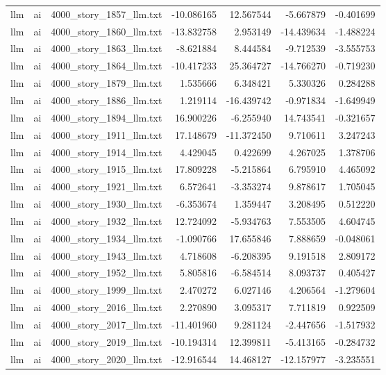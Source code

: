 \begin{longtable}{lllrrrr}
llm & ai & 4000\_story\_1857\_llm.txt & -10.086165 & 12.567544 & -5.667879 & -0.401699 \\
llm & ai & 4000\_story\_1860\_llm.txt & -13.832758 & 2.953149 & -14.439634 & -1.488224 \\
llm & ai & 4000\_story\_1863\_llm.txt & -8.621884 & 8.444584 & -9.712539 & -3.555753 \\
llm & ai & 4000\_story\_1864\_llm.txt & -10.417233 & 25.364727 & -14.766270 & -0.719230 \\
llm & ai & 4000\_story\_1879\_llm.txt & 1.535666 & 6.348421 & 5.330326 & 0.284288 \\
llm & ai & 4000\_story\_1886\_llm.txt & 1.219114 & -16.439742 & -0.971834 & -1.649949 \\
llm & ai & 4000\_story\_1894\_llm.txt & 16.900226 & -6.255940 & 14.743541 & -0.321657 \\
llm & ai & 4000\_story\_1911\_llm.txt & 17.148679 & -11.372450 & 9.710611 & 3.247243 \\
llm & ai & 4000\_story\_1914\_llm.txt & 4.429045 & 0.422699 & 4.267025 & 1.378706 \\
llm & ai & 4000\_story\_1915\_llm.txt & 17.809228 & -5.215864 & 6.795910 & 4.465092 \\
llm & ai & 4000\_story\_1921\_llm.txt & 6.572641 & -3.353274 & 9.878617 & 1.705045 \\
llm & ai & 4000\_story\_1930\_llm.txt & -6.353674 & 1.359447 & 3.208495 & 0.512220 \\
llm & ai & 4000\_story\_1932\_llm.txt & 12.724092 & -5.934763 & 7.553505 & 4.604745 \\
llm & ai & 4000\_story\_1934\_llm.txt & -1.090766 & 17.655846 & 7.888659 & -0.048061 \\
llm & ai & 4000\_story\_1943\_llm.txt & 4.718608 & -6.208395 & 9.191518 & 2.809172 \\
llm & ai & 4000\_story\_1952\_llm.txt & 5.805816 & -6.584514 & 8.093737 & 0.405427 \\
llm & ai & 4000\_story\_1999\_llm.txt & 2.470272 & 6.027146 & 4.206564 & -1.279604 \\
llm & ai & 4000\_story\_2016\_llm.txt & 2.270890 & 3.095317 & 7.711819 & 0.922509 \\
llm & ai & 4000\_story\_2017\_llm.txt & -11.401960 & 9.281124 & -2.447656 & -1.517932 \\
llm & ai & 4000\_story\_2019\_llm.txt & -10.194314 & 12.399811 & -5.413165 & -0.284732 \\
llm & ai & 4000\_story\_2020\_llm.txt & -12.916544 & 14.468127 & -12.157977 & -3.235551 \\

\end{longtable}
